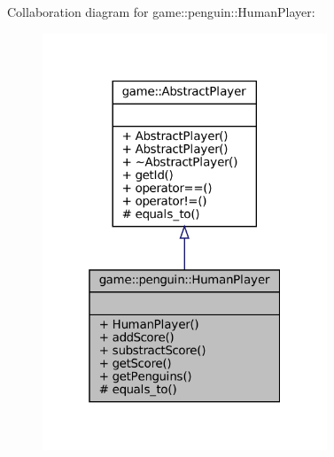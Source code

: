 Collaboration diagram for game\+:\+:penguin\+:\+:Human\+Player\+:
\nopagebreak
\begin{figure}[H]
\begin{center}
\leavevmode
\includegraphics[width=241pt]{classgame_1_1penguin_1_1_human_player__coll__graph}
\end{center}
\end{figure}
